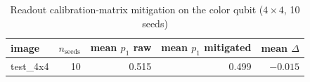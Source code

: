 
\begin{table}[htbp]
\centering
\caption{Readout calibration-matrix mitigation on the color qubit ($4\times 4$, 10 seeds)}
\label{tab:readout_summary}
\begin{tabular}{lrrrr}
\toprule
image & $n_{\mathrm{seeds}}$ & mean $p_1$ raw & mean $p_1$ mitigated & mean $\Delta$ \\
\midrule
test\_4x4 & 10 & 0.515 & 0.499 & $-0.015$ \\
\bottomrule
\end{tabular}
\end{table}
